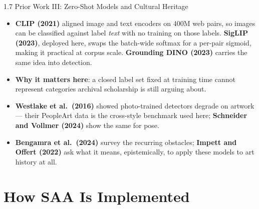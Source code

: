 \documentclass[aspectratio=169,11pt]{beamer}
\begin{document}
\begin{frame}{1.7 Prior Work III: Zero-Shot Models and Cultural Heritage}
\footnotesize
\begin{itemize}
  \setlength\itemsep{6pt}
  \item \textbf{CLIP (2021)} aligned image and text encoders on 400M web pairs, so images can be classified against label \emph{text} with no training on those labels. \textbf{SigLIP (2023)}, deployed here, swaps the batch-wide softmax for a per-pair sigmoid, making it practical at corpus scale. \textbf{Grounding DINO (2023)} carries the same idea into detection.
  \item \textbf{Why it matters here}: a closed label set fixed at training time cannot represent categories archival scholarship is still arguing about.
  \item \textbf{Westlake et al.\ (2016)} showed photo-trained detectors degrade on artwork --- their PeopleArt data is the cross-style benchmark used here; \textbf{Schneider and Vollmer (2024)} show the same for pose.
  \item \textbf{Bengamra et al.\ (2024)} survey the recurring obstacles; \textbf{Impett and Offert (2022)} ask what it means, epistemically, to apply these models to art history at all.
\end{itemize}
\end{frame}

\section{How SAA Is Implemented}
\end{document}
